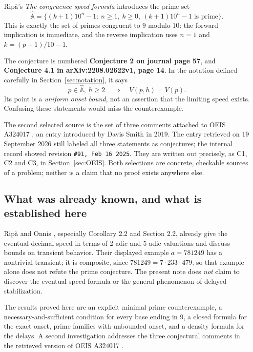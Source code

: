 \documentclass[11pt,letterpaper]{article}
\numberwithin{equation}{section}
\theoremstyle{definition}
\theoremstyle{remark}
\begin{document}
Rip\`a's \emph{The congruence speed formula} \cite{Ripa2021} introduces the prime set
\begin{equation}\label{eq:source-set}
 \widehat{\mathbb A}=\{(k+1)10^n-1:\ n\ge1,\ k\ge0,\ (k+1)10^n-1\text{ is prime}\}.
\end{equation}
This is exactly the set of primes congruent to $9$ modulo $10$: the forward implication is immediate, and the reverse implication uses $n=1$ and $k=(p+1)/10-1$.

The conjecture is numbered \textbf{Conjecture 2 on journal page 57}, and \textbf{Conjecture 4.1 in arXiv:2208.02622v1, page 14}. In the notation defined carefully in Section~\ref{sec:notation}, it says
\begin{equation}\label{eq:conjecture}
  p\in\widehat{\mathbb A},\ h\ge2
  \quad\Longrightarrow\quad V(p,h)=V(p).
\end{equation}
Its point is a \emph{uniform onset bound}, not an assertion that the limiting speed exists. Confusing these statements would miss the counterexample.

The second selected source is the set of three comments attached to OEIS A324017 \cite{OEIS324017}, an entry introduced by Davis Smith in 2019. The entry retrieved on 19 September 2026 still labeled all three statements as conjectures; the internal record showed revision \texttt{\#91, Feb 16 2025}. They are written out precisely, as C1, C2 and C3, in Section~\ref{sec:OEIS}. Both selections are concrete, checkable sources of a problem; neither is a claim that no proof exists anywhere else.

\subsection{What was already known, and what is established here}

Rip\`a and Onnis \cite{RipaOnnis2022}, especially Corollary 2.2 and Section 2.2, already give the eventual decimal speed in terms of 2-adic and 5-adic valuations and discuss bounds on transient behavior. Their displayed example $a=781249$ has a nontrivial transient; it is composite, since $781249=7\cdot233\cdot479$, so that example alone does not refute the prime conjecture. The present note does \emph{not} claim to discover the eventual-speed formula or the general phenomenon of delayed stabilization.

The results proved here are an explicit minimal prime counterexample, a necessary-and-sufficient condition for every base ending in 9, a closed formula for the exact onset, prime families with unbounded onset, and a density formula for the delays. A second investigation addresses the three conjectural comments in the retrieved version of OEIS A324017 \cite{OEIS324017}.
\end{document}
